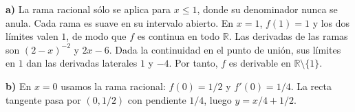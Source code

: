 \textbf{a)} La rama racional sólo se aplica para $x\le1$, donde su denominador nunca se anula. Cada rama es suave en su intervalo abierto. En $x=1$, $f(1)=1$ y los dos límites valen $1$, de modo que $f$ es continua en todo $\mathbb R$. Las derivadas de las ramas son $(2-x)^{-2}$ y $2x-6$. Dada la continuidad en el punto de unión, sus límites en $1$ dan las derivadas laterales $1$ y $-4$. Por tanto, $f$ es derivable en $\mathbb R\setminus\{1\}$.

\textbf{b)} En $x=0$ usamos la rama racional: $f(0)=1/2$ y $f'(0)=1/4$. La recta tangente pasa por $(0,1/2)$ con pendiente $1/4$, luego $\boxed{y=x/4+1/2}$.
